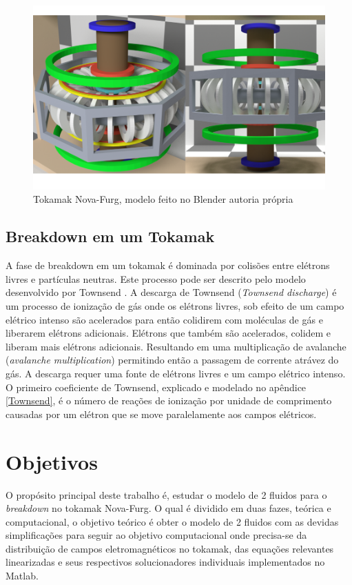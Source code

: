 \documentclass[12pt,oneside,a4paper]{abntex2}
\begin{document}
\begin{figure}[h]
\centering
\caption{Tokamak Nova-Furg, modelo feito no Blender autoria própria}
\label{fig: Rotulotokamak1}
\includegraphics[scale=0.4]{tokamak12.png}    
\end{figure}

\section{Breakdown em um Tokamak}
A fase de breakdown em um tokamak é dominada por colisões entre elétrons livres e partículas neutras.
Este processo pode ser descrito pelo modelo desenvolvido por Townsend \cite{lloyd1991}. A descarga de Townsend (\textit{Townsend discharge}) é um processo de ionização de gás onde os elétrons livres, sob efeito de um campo elétrico intenso são acelerados para então colidirem com moléculas de gás e liberarem elétrons adicionais. Elétrons que também são acelerados, colidem e liberam mais elétrons adicionais. Resultando em uma multiplicação de avalanche (\textit{avalanche multiplication}) permitindo então a passagem de corrente atrávez do gás. A descarga requer uma fonte de elétrons livres e um campo elétrico intenso. O primeiro coeficiente de Townsend, explicado e modelado no apêndice \ref{Townsend}, é o número de reações de ionização por unidade de comprimento causadas por um elétron que se move paralelamente aos campos elétricos. 

\chapter{Objetivos}
O propósito principal deste trabalho é, estudar o modelo de 2 fluidos para o \textit{breakdown} no tokamak Nova-Furg. O qual é dividido em duas fazes, teórica e computacional, o objetivo teórico é obter o modelo de 2 fluidos com as devidas simplificações para seguir ao objetivo computacional onde precisa-se da distribuição de campos eletromagnéticos no tokamak, das equações relevantes linearizadas e seus respectivos solucionadores individuais implementados no Matlab.
\end{document}
